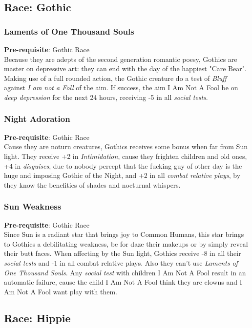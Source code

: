\documentclass[ letterpaper,12pt]{article}
\begin{document}
\subsection{Race: Gothic}

\subsubsection{Laments of One Thousand Souls}
{\bf Pre-requisite}: Gothic Race\\
Because they are adepts of the second generation romantic poesy, Gothics are master on depressive art: they can end with the day of the happiest "Care Bear". Making use of a full rounded action, the Gothic creature do a test of {\it Bluff} against {\it I am not a Foll} of the aim. If success, the aim I Am Not A Fool be on {\it deep depression} for the next 24 hours, receiving -5 in all {\it social tests}.

\subsubsection{Night Adoration}
{\bf Pre-requisite}: Gothic Race\\
Cause they are noturn creatures, Gothics receives some bonus when far from Sun light.  They receive +2 in {\it Intimidation}, cause they frighten children and old ones, +4 in {\it disguises}, due to nobody percept that the fucking guy of other day is the huge and imposing Gothic of the Night, and +2 in all {\it combat relative plays}, by they know the benefities of shades and nocturnal whispers.\\

\subsubsection{Sun Weakness}
 {\bf Pre-requisite}: Gothic Race\\
 Since Sun is a radiant star that brings joy to Common Humans, this star brings to Gothics a debilitating weakness, be for daze their makeups or by simply reveal their butt faces. When affecting by the Sun light, Gothics receive -8 in all their {\it social tests} and -1 in all {combat relative plays}. Also they can't use {\it Laments of One Thousand Souls}. Any {\it social test} with children I Am Not A Fool result in an automatic failure, cause the child I Am Not A Fool think they are clowns and I Am Not A Fool want play with them.

\subsection{Race: Hippie}
\end{document}
